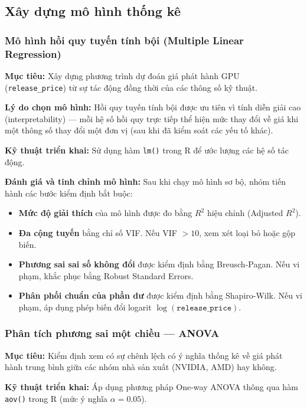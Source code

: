 \documentclass[a4paper]{article}
\begin{document}
\subsection{Xây dựng mô hình thống kê}

\subsubsection{Mô hình hồi quy tuyến tính bội (Multiple Linear Regression)}

\textbf{Mục tiêu:} Xây dựng phương trình dự đoán giá phát hành GPU (\texttt{release\_price}) từ sự tác động đồng thời của các thông số kỹ thuật.

\textbf{Lý do chọn mô hình:} Hồi quy tuyến tính bội được ưu tiên vì tính diễn giải cao (interpretability) --- mỗi hệ số hồi quy trực tiếp thể hiện mức thay đổi về giá khi một thông số thay đổi một đơn vị (sau khi đã kiểm soát các yếu tố khác).

\textbf{Kỹ thuật triển khai:} Sử dụng hàm \texttt{lm()} trong R để ước lượng các hệ số tác động.

\textbf{Đánh giá và tinh chỉnh mô hình:} Sau khi chạy mô hình sơ bộ, nhóm tiến hành các bước kiểm định bắt buộc:
\begin{itemize}
    \item \textbf{Mức độ giải thích} của mô hình được đo bằng $R^2$ hiệu chỉnh (Adjusted $R^2$).
    \item \textbf{Đa cộng tuyến} bằng chỉ số VIF. Nếu VIF $> 10$, xem xét loại bỏ hoặc gộp biến.
    \item \textbf{Phương sai sai số không đổi} được kiểm định bằng Breusch-Pagan. Nếu vi phạm, khắc phục bằng Robust Standard Errors.
    \item \textbf{Phân phối chuẩn của phần dư} được kiểm định bằng Shapiro-Wilk. Nếu vi phạm, áp dụng phép biến đổi logarit $\log(\texttt{release\_price})$.
\end{itemize}

\subsubsection{Phân tích phương sai một chiều --- ANOVA}

\textbf{Mục tiêu:} Kiểm định xem có sự chênh lệch có ý nghĩa thống kê về giá phát hành trung bình giữa các nhóm nhà sản xuất (NVIDIA, AMD) hay không.

\textbf{Kỹ thuật triển khai:} Áp dụng phương pháp One-way ANOVA thông qua hàm \texttt{aov()} trong R (mức ý nghĩa $\alpha = 0.05$).
\end{document}
